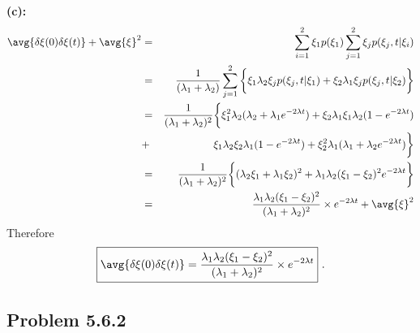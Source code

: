\textbf{(c):}
\begin{eqnarray}
\avg{\delta \xi(0) \delta \xi(t)} + \avg{\xi}^2 &=& \sum_{i=1}^{2} \xi_1 p(\xi_1) \sum_{j=1}^{2}  \xi_j p(\xi_j, t| \xi_i) \nonumber \\
&=& \frac{1}{(\lambda_1 + \lambda_2)}\sum_{j=1}^{2} \bigg\{  \xi_1 \lambda_2 \xi_j p(\xi_j, t| \xi_1) + \xi_2 \lambda_1 \xi_j p(\xi_j, t| \xi_2) \bigg\} \nonumber \\
&=& \frac{1}{(\lambda_1 + \lambda_2)^2} \bigg\{  \xi_1^2 \lambda_2 (\lambda_2 + \lambda_1 e^{-2 \lambda t}) + \xi_2 \lambda_1 \xi_1 \lambda_2 (1-e^{-2 \lambda t}) \nonumber \\
&+& \xi_1 \lambda_2 \xi_2 \lambda_1 (1-e^{-2 \lambda t}) + \xi_2^2 \lambda_1 (\lambda_1 + \lambda_2 e^{-2 \lambda t}) \bigg\} \nonumber \\
&=& \frac{1}{(\lambda_1 + \lambda_2)^2} \bigg\{ (\lambda_2 \xi_1 + \lambda_1 \xi_2)^2  + \lambda_1 \lambda_2 (\xi_1-\xi_2)^2 e^{- 2 \lambda t} \bigg\} \nonumber  \\
&=& \frac{\lambda_1 \lambda_2 (\xi_1-\xi_2)^2}{(\lambda_1 + \lambda_2)^2} \times e^{- 2 \lambda t} + \avg{\xi}^2
\end{eqnarray}
Therefore
\begin{equation}
\boxed{\avg{\delta \xi(0) \delta \xi(t)} = \frac{\lambda_1 \lambda_2 (\xi_1-\xi_2)^2}{(\lambda_1 + \lambda_2)^2} \times e^{- 2 \lambda t}}~.
\end{equation}

\subsection{Problem 5.6.2}


